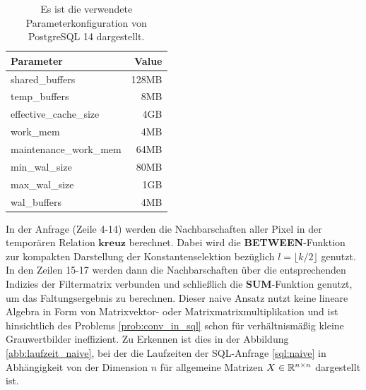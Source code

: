 \begin{table}[h]
    \centering
    \begin{tabular}{|l|r|} \hline
        Parameter & Value \\
        \hline
        shared\_buffers &128MB \\
        \hline
        temp\_buffers &8MB \\
        \hline
        effective\_cache\_size &4GB \\
        \hline
        work\_mem &4MB \\
        \hline
        maintenance\_work\_mem &64MB \\
        \hline
        min\_wal\_size &80MB \\
        \hline
        max\_wal\_size &1GB \\
        \hline
        wal\_buffers &4MB \\
        \hline
    \end{tabular}
    \caption[]{Es ist die verwendete Parameterkonfiguration von PostgreSQL 14 dargestellt.}
    \label{tab:systemspecs}
\end{table}



In der Anfrage (Zeile 4-14) werden die Nachbarschaften aller Pixel in der temporären Relation $\mathbf{kreuz}$ berechnet. Dabei wird die \textbf{BETWEEN}-Funktion zur kompakten Darstellung der Konstantenselektion bezüglich $l=\lfloor k/2 \rfloor$ genutzt. In den Zeilen 15-17 werden dann die Nachbarschaften über die entsprechenden Indizies der Filtermatrix verbunden und schließlich die \textbf{SUM}-Funktion genutzt, um das Faltungsergebnis zu berechnen. Dieser naive Ansatz nutzt keine lineare Algebra in Form von Matrixvektor- oder Matrixmatrixmultiplikation und ist hinsichtlich des Problems \ref{prob:conv_in_sql} schon für verhältnismäßig kleine Grauwertbilder ineffizient. Zu Erkennen ist dies in der Abbildung \ref{abb:laufzeit_naive}, bei der die Laufzeiten der SQL-Anfrage \ref{sql:naive} in Abhängigkeit von der Dimension $n$ für allgemeine Matrizen $X \in \mathbb{R}^{n \times n}$ dargestellt ist.

